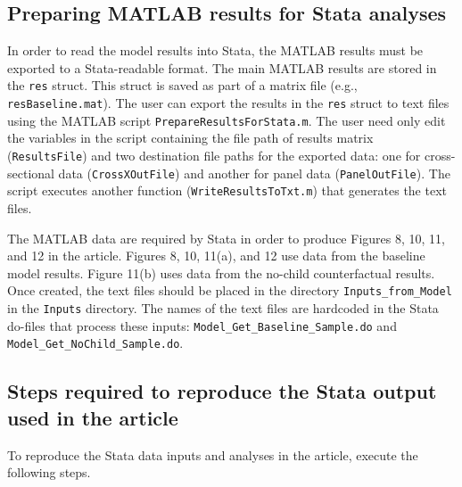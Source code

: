 \documentclass[a4,12p]{article}
\begin{document}
\subsection{Preparing MATLAB results for Stata analyses}

In order to read the model results into Stata, the MATLAB results must be exported to a Stata-readable format. The main MATLAB results are stored in the {\tt res} struct. This struct is saved as part of a matrix file (e.g., {\tt resBaseline.mat}). The user can export the results in the {\tt res} struct to text files using the MATLAB script {\tt PrepareResultsForStata.m}. The user need only edit the variables in the script containing the file path of results matrix ({\tt ResultsFile}) and two destination file paths for the exported data: one for cross-sectional data ({\tt CrossXOutFile}) and another for panel data ({\tt PanelOutFile}). The script executes another function ({\tt WriteResultsToTxt.m}) that generates the text files. 

The MATLAB data are required by Stata in order to produce Figures 8, 10, 11, and 12 in the article. Figures 8, 10, 11(a), and 12 use data from the baseline model results. Figure 11(b) uses data from the no-child counterfactual results. Once created, the text files should be placed in the directory {\tt Inputs\_from\_Model} in the {\tt Inputs} directory. The names of the text files are hardcoded in the Stata do-files that process these inputs: {\tt Model\_Get\_Baseline\_Sample.do} and {\tt Model\_Get\_NoChild\_Sample.do}.

\subsection{Steps required to reproduce the Stata output used in the article}

To reproduce the Stata data inputs and analyses in the article, execute the following steps.
\end{document}
